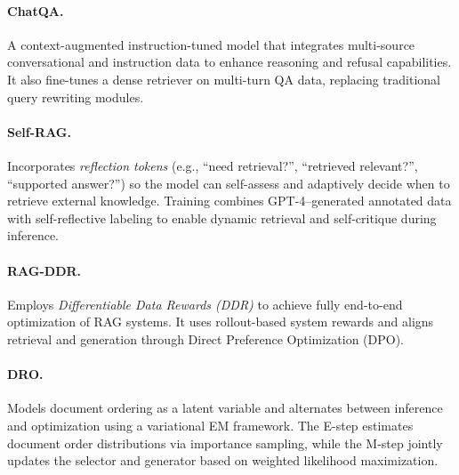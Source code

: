 \documentclass{applemlr}
\numberwithin{equation}{section}
\begin{document}
\paragraph{ChatQA. \citep{10.5555/3737916.3738409}}
A context-augmented instruction-tuned model 
that integrates multi-source conversational and instruction data 
to enhance reasoning and refusal capabilities. 
It also fine-tunes a dense retriever on multi-turn QA data, 
replacing traditional query rewriting modules.

\paragraph{Self-RAG. \citep{asai2024selfrag}}
Incorporates \textit{reflection tokens} (e.g., ``need retrieval?'', ``retrieved relevant?'', ``supported answer?'') 
so the model can self-assess and adaptively decide when to retrieve external knowledge. 
Training combines GPT-4–generated annotated data with self-reflective labeling 
to enable dynamic retrieval and self-critique during inference.

\paragraph{RAG-DDR. \citep{li2025ragddr}}
Employs \textit{Differentiable Data Rewards (DDR)} 
to achieve fully end-to-end optimization of RAG systems. 
It uses rollout-based system rewards 
and aligns retrieval and generation through Direct Preference Optimization (DPO).

\paragraph{DRO. \citep{shi2025directretrievalaugmentedoptimizationsynergizing}}
Models document ordering as a latent variable 
and alternates between inference and optimization using a variational EM framework. 
The E-step estimates document order distributions via importance sampling, 
while the M-step jointly updates the selector and generator 
based on weighted likelihood maximization.
\end{document}
